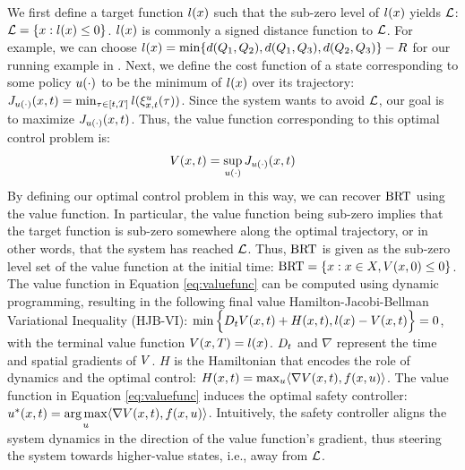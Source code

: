 We first define a target function $l(x)$ such that the sub-zero level of $l(x)$ yields $\mathcal{L}$: $\mathcal{L} = \{x: l(x) \le 0\}$.
$l(x)$ is commonly a signed distance function to $\mathcal{L}$. For example, we can choose $l(x) = \min\{d(Q_1, Q_2), d(Q_1, Q_3), d(Q_2, Q_3)\}-R$ for our running example in .
Next, we define the cost function of a state corresponding to some policy $u(\cdot)$ to be the minimum of $l(x)$ over its trajectory: $J_{u(\cdot)}(x,t) = \min_{\tau \in [t, T]} l(\xi_{x,t}^{u}(\tau))$.
Since the system wants to avoid $\mathcal{L}$, our goal is to maximize $J_{u(\cdot)}(x,t)$.  
Thus, the value function corresponding to this optimal control problem is:
% 
\vspace{-0.5em}
\begin{equation}
    \label{eq:valuefunc}
    \vfunc(\state,\tvar) = \sup_{\cfunc} \costfunctional_{\cfunc}(\state,\tvar)
    \vspace{-0.5em}
\end{equation}
% 
By defining our optimal control problem in this way, we can recover $\text{BRT}$ using the value function. In particular, the value function being sub-zero implies that the target function is sub-zero somewhere along the optimal trajectory, or in other words, that the system has reached $\mathcal{L}$. Thus, $\text{BRT}$ is given as the sub-zero level set of the value function at the initial time: $\text{BRT} = \{x: x\in X, V(x,0) \le 0 \}$.
The value function in Equation \eqref{eq:valuefunc} can be computed using dynamic programming, resulting in the following final value Hamilton-Jacobi-Bellman Variational Inequality (HJB-VI): $\min\Big\{D_t V(x,t)+ H(x,t), l(x)-V(x,t)\Big\} = 0$, with the terminal value function $V(x,T) = l(x)$. 
$D_t$ and $\nabla$ represent the time and spatial gradients of $V$. 
$H$ is the Hamiltonian that encodes the role of dynamics and the optimal control: $H(x,t) = \max_u \langle \nabla V(x,t), f(x,u)\rangle$.
The value function in Equation \eqref{eq:valuefunc} induces the optimal safety controller: $u^*(x,t) = \underset{u}{\arg\max} \langle \nabla V(x,t), f(x,u)\rangle$.
Intuitively, the safety controller aligns the system dynamics in the direction of the value function's gradient, thus steering the system towards higher-value states, i.e., away from $\mathcal{L}$.

